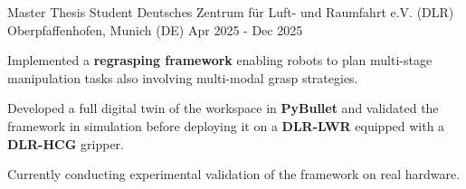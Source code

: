 
\cventry
{Master Thesis Student}
{Deutsches Zentrum für Luft- und Raumfahrt e.V. (DLR)}
{Oberpfaffenhofen, Munich (DE)}
{Apr 2025 - Dec 2025}
{
    \begin{cvitems}
        \item {Implemented a \textbf{regrasping framework} enabling robots to plan multi-stage manipulation tasks also involving multi-modal grasp strategies.}
        \item {Developed a full digital twin of the workspace in \textbf{PyBullet} and validated the framework in simulation before deploying it on a \textbf{DLR-LWR} equipped with a \textbf{DLR-HCG} gripper.}
        \item {Currently conducting experimental validation of the framework on real hardware.}
    \end{cvitems}
}